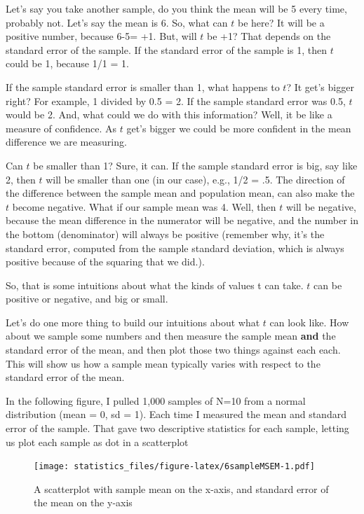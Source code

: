 \documentclass[]{book}
\begin{document}
Let's say you take another sample, do you think the mean will be 5 every time, probably not. Let's say the mean is 6. So, what can \(t\) be here? It will be a positive number, because 6-5= +1. But, will \(t\) be +1? That depends on the standard error of the sample. If the standard error of the sample is 1, then \(t\) could be 1, because 1/1 = 1.

If the sample standard error is smaller than 1, what happens to \(t\)? It get's bigger right? For example, 1 divided by 0.5 = 2. If the sample standard error was 0.5, \(t\) would be 2. And, what could we do with this information? Well, it be like a measure of confidence. As \(t\) get's bigger we could be more confident in the mean difference we are measuring.

Can \(t\) be smaller than 1? Sure, it can. If the sample standard error is big, say like 2, then \(t\) will be smaller than one (in our case), e.g., 1/2 = .5. The direction of the difference between the sample mean and population mean, can also make the \(t\) become negative. What if our sample mean was 4. Well, then \(t\) will be negative, because the mean difference in the numerator will be negative, and the number in the bottom (denominator) will always be positive (remember why, it's the standard error, computed from the sample standard deviation, which is always positive because of the squaring that we did.).

So, that is some intuitions about what the kinds of values t can take. \(t\) can be positive or negative, and big or small.

Let's do one more thing to build our intuitions about what \(t\) can look like. How about we sample some numbers and then measure the sample mean \textbf{and} the standard error of the mean, and then plot those two things against each each. This will show us how a sample mean typically varies with respect to the standard error of the mean.

In the following figure, I pulled 1,000 samples of N=10 from a normal distribution (mean = 0, sd = 1). Each time I measured the mean and standard error of the sample. That gave two descriptive statistics for each sample, letting us plot each sample as dot in a scatterplot

\begin{figure}
\centering
\texttt{[image: statistics\_files/figure-latex/6sampleMSEM-1.pdf]}
\caption{\label{fig:6sampleMSEM}A scatterplot with sample mean on the x-axis, and standard error of the mean on the y-axis}
\end{figure}
\end{document}
